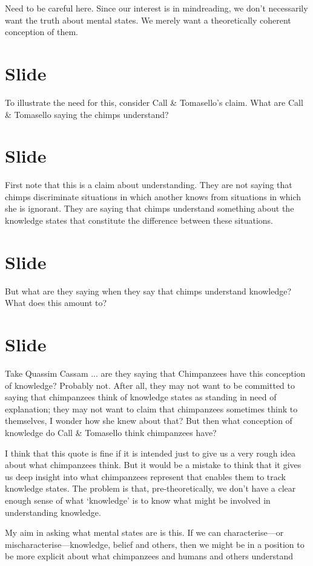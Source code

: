 \documentclass[12pt,\papersize]{extarticle}
\begin{document}
Need to be careful here.  Since our interest is in mindreading, we don’t necessarily want the truth about mental states.  We merely want a theoretically coherent conception of them.


\section{Slide}
To illustrate the need for this, consider Call \& Tomasello’s claim.
What are Call \& Tomasello saying the chimps understand?


\section{Slide}
First note that this is a claim about understanding.  They are not saying that chimps discriminate situations in which another knows from situations in which she is ignorant.
They are saying that chimps understand something about the knowledge states that constitute the difference between these situations.



\section{Slide}
But what are they saying when they say that chimps understand knowledge?  What does this amount to?


\section{Slide}
Take Quassim Cassam ... are they saying that Chimpanzees have this conception of knowledge? Probably not.  After all, they may not want to be committed to saying that chimpanzees think of knowledge states as standing in need of explanation; they may not want to claim that chimpanzees sometimes think to themselves, I wonder how she knew about that?
But then what conception of knowledge do Call \& Tomasello think chimpanzees have?

I think that this quote is fine if it is intended just to give us a very rough idea about what chimpanzees think.
But it would be a mistake to think that it gives us deep insight into what chimpanzees represent that enables them to track knowledge states.
The problem is that, pre-theoretically, we don’t have a clear enough sense of what ‘knowledge’ is to know what might be involved in understanding knowledge.

My aim in asking what mental states are is this.
If we can characterise---or mischaracterise---knowledge, belief and others, then we might be in a position to be more explicit about what chimpanzees and humans and others understand
\end{document}
